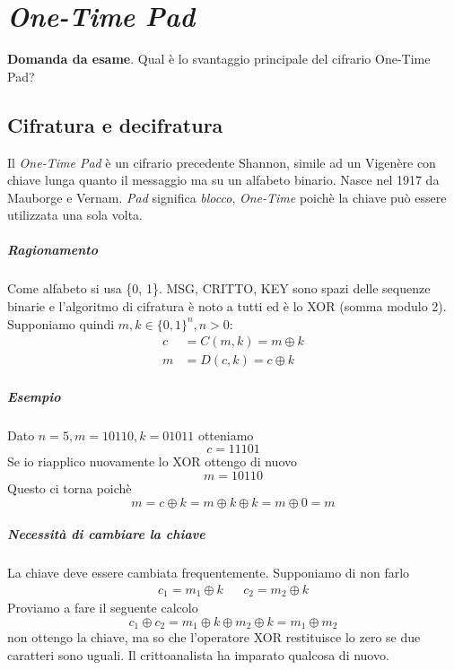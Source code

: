 \chapter{\emph{One-Time Pad}}
\begin{framed}
	\noindent \textbf{Domanda da esame}. Qual è lo svantaggio principale del cifrario One-Time Pad?
\end{framed} 
\section{Cifratura e decifratura}
Il \emph{One-Time Pad} è un cifrario precedente Shannon, simile ad un Vigenère con chiave lunga quanto il messaggio ma su un alfabeto binario. Nasce nel 1917 da Mauborge e Vernam. \emph{Pad} significa \emph{blocco}, \emph{One-Time} poichè la chiave può essere utilizzata una sola volta.

\paragraph{Ragionamento} Come alfabeto si usa \{0, 1\}. MSG, CRITTO, KEY sono spazi delle sequenze binarie e l'algoritmo di cifratura è noto a tutti ed è lo XOR (somma modulo 2). Supponiamo quindi $m, k \in \{0, 1\}^{n}, n > 0$:
\begin{align*}
	c &= C(m, k) = m \oplus k\\
	 m &= D(c, k) = c \oplus k
\end{align*}

\paragraph{Esempio} Dato $n=5, m=10110, k=01011$ otteniamo
$$c=11101$$
Se io riapplico nuovamente lo XOR ottengo di nuovo
$$m=10110$$
Questo ci torna poichè
$$m = c \oplus k = m \oplus k \oplus k = m \oplus 0 = m$$
\paragraph{Necessità di cambiare la chiave} La chiave deve essere cambiata frequentemente. Supponiamo di non  farlo
\begin{align*}
	c_1 = m_1 \oplus k
	&&
	c_2 = m_2 \oplus k
\end{align*}
Proviamo a fare il seguente calcolo
$$ c_1 \oplus c_2 = m_1 \oplus k \oplus m_2 \oplus k = m_1 \oplus m_2 $$
non ottengo la chiave, ma so che l'operatore XOR restituisce lo zero se due caratteri sono uguali. Il crittoanalista ha imparato qualcosa di nuovo. 
